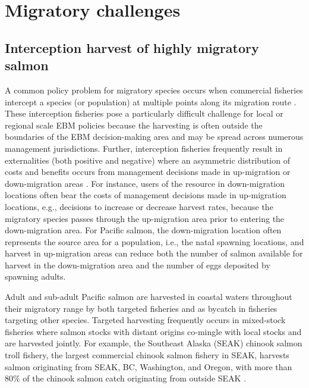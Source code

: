 \section{Migratory challenges}

\subsection{Interception harvest of highly migratory salmon}

A common policy problem for migratory species occurs when commercial
fisheries intercept a species (or population) at multiple points along
its migration route \citep{Lascelles2014}. These interception fisheries
pose a particularly difficult challenge for local or regional scale EBM
policies because the harvesting is often outside the boundaries of the
EBM decision-making area and may be spread across numerous management
jurisdictions. Further, interception fisheries frequently result in
externalities (both positive and negative) where an asymmetric
distribution of costs and benefits occurs from management decisions made
in up-migration or down-migration areas \citep{Scherer1990}. For
instance, users of the resource in down-migration locations often bear
the costs of management decisions made in up-migration locations, e.g.,
decisions to increase or decrease harvest rates, because the migratory
species passes through the up-migration area prior to entering the
down-migration area. For Pacific salmon, the down-migration location
often represents the source area for a population, i.e., the natal
spawning locations, and harvest in up-migration areas can reduce both
the number of salmon available for harvest in the down-migration area
and the number of eggs deposited by spawning adults.

Adult and sub-adult Pacific salmon are harvested in coastal waters
throughout their migratory range by both targeted fisheries and as
bycatch in fisheries targeting other species. Targeted harvesting
frequently occurs in mixed-stock fisheries where salmon stocks with
distant origins co-mingle with local stocks and are harvested jointly.
For example, the Southeast Alaska (SEAK) chinook salmon troll fishery,
the largest commercial chinook salmon fishery in SEAK, harvests salmon
originating from SEAK, BC, Washington, and Oregon, with more than 80\%
of the chinook salmon catch originating from outside SEAK
\citep{Templin2004}.


